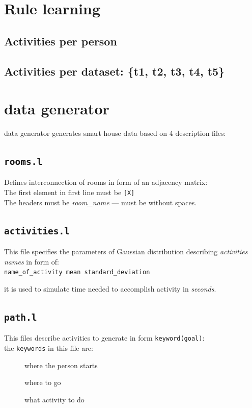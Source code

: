 \documentclass[12pt, a4paper, pdflatex, leqno, twoside]{report}
\begin{document}
\chapter{Rule learning}
\section{Activities per person}
\section{Activities per dataset: \{t1, t2, t3, t4, t5\}}

\chapter{data generator}

data generator generates smart house data based on 4 description files:
\section{\texttt{rooms.l}}
Defines interconnection of rooms in form of an adjacency matrix:\\


The first element in first line must be \texttt{[X]}\\
The headers must be \emph{room_name} --- must be without spaces.

\section{\texttt{activities.l}}
This file specifies the parameters of Gaussian distribution describing \emph{activities names} in form of:\\
\texttt{name_of_activity mean standard_deviation}

it is used to simulate time needed to accomplish activity in \emph{seconds}.



\section{\texttt{path.l}}
This files describe activities to generate in form \texttt{keyword(goal)}:\\


the \texttt{keywords} in this file are:\\
\begin{description}
\item[] where the person starts
\item[] where to go
\item[] what activity to do
\end{description}
\end{document}
